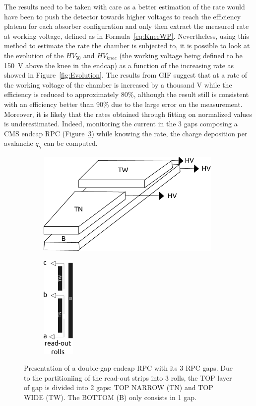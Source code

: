 	The results need to be taken with care as a better estimation of the rate would have been to push the detector towards higher voltages to reach the efficiency plateau for each absorber configuration and only then extract the measured rate at working voltage, defined as in Formula~\ref{eq:KneeWP}. Nevertheless, using this method to estimate the rate the chamber is subjected to, it is possible to look at the evolution of the $HV_{50}$ and $HV_{knee}$ (the working voltage being defined to be \SI{150}{V} above the knee in the endcap) as a function of the increasing rate as showed in Figure~\ref{fig:Evolution}. The results from GIF suggest that at a rate of  the working voltage of the chamber is increased by a thousand \si{V} while the efficiency is reduced to approximately 80\%, although the result still is consistent with an efficiency better than 90\% due to the large error on the measurement. Moreover, it is likely that the rates obtained through fitting on normalized values is underestimated. Indeed, monitoring the current in the 3 gaps composing a CMS endcap RPC (Figure~\ref{fig:EndcapRPC}) while knowing the rate, the charge deposition per avalanche $q_\gamma$ can be computed.
	
	\begin{figure}[H]
    	\begin{subfigure}{0.69\linewidth}
			\centering
    		\includegraphics[height = 5cm]{fig/chapt5/Endcap-3D.pdf}
        	\caption{\label{fig:EndcapRPC:A}}
    	\end{subfigure}
    	\begin{subfigure}{0.29\linewidth}
			\centering
    		\includegraphics[height = 5cm]{fig/chapt5/Endcap-side.pdf}\\
        	\caption{\label{fig:EndcapRPC:B}}
    	\end{subfigure}
		\caption{\label{fig:EndcapRPC} Presentation of a double-gap endcap RPC with its 3 RPC gaps. Due to the partitioniing of the read-out strips into 3 rolls, the TOP layer of gap is divided into 2 gaps: TOP NARROW (TN) and TOP WIDE (TW). The BOTTOM (B) only consists in 1 gap.}
	\end{figure}
	

